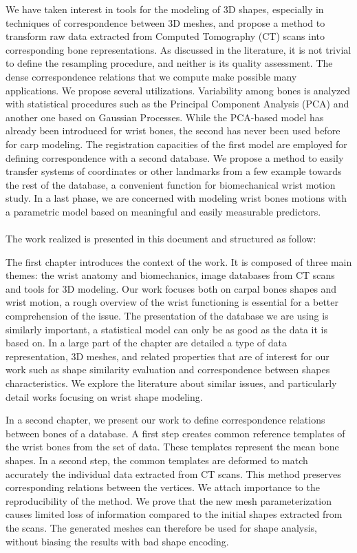 \documentclass[../../Main_ManuscritThese.tex]{subfiles}
\begin{document}
We have taken interest in tools for the modeling of 3D shapes, especially in techniques of correspondence between 3D meshes, and propose a method to transform raw data extracted from Computed Tomography (CT) scans into corresponding bone representations. As discussed in the literature, it is not trivial to define the resampling procedure, and neither is its quality assessment. The dense correspondence relations that we compute make possible many applications. We propose several utilizations. Variability among bones is analyzed with statistical procedures such as the Principal Component Analysis (PCA) and another one based on Gaussian Processes. While the PCA-based model has already been introduced for wrist bones, the second has never been used before for carp modeling. The registration capacities of the first model are employed for defining correspondence with a second database. We propose a method to easily transfer systems of coordinates or other landmarks from a few example towards the rest of the database, a convenient function for biomechanical wrist motion study. In a last phase, we are concerned with modeling wrist bones motions with a parametric model based on meaningful and easily measurable predictors. \\ \\
The work realized is presented in this document and structured as follow: 

The first chapter introduces the context of the work. It is composed of three main themes: the wrist anatomy and biomechanics, image databases from CT scans and tools for 3D modeling. Our work focuses both on carpal bones shapes and wrist motion, a rough overview of the wrist functioning is essential for a better comprehension of the issue. The presentation of the database we are using is similarly important, a statistical model can only be as good as the data it is based on. In a large part of the chapter are detailed a type of data representation, 3D meshes, and related properties that are of interest for our work such as shape similarity evaluation and correspondence between shapes characteristics. We explore the literature about similar issues, and particularly detail works focusing on wrist shape modeling. 

In a second chapter, we present our work to define correspondence relations between bones of a database. A first step creates common reference templates of the wrist bones from the set of data. These templates represent the mean bone shapes. In a second step, the common templates are deformed to match accurately the individual data extracted from CT scans. This method preserves corresponding relations between the vertices. We attach importance to the reproducibility of the method. We prove that the new mesh parameterization causes limited loss of information compared to the initial shapes extracted from the scans. The generated meshes can therefore be used for shape analysis, without biasing the results with bad shape encoding. 
\end{document}
